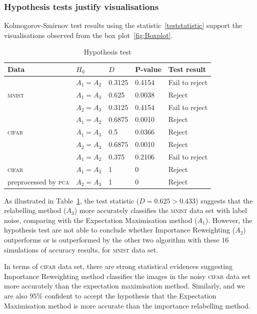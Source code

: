 \documentclass[12pt]{article} %
\begin{document}
\subsubsection{Hypothesis tests justify visualisations}
Kolmogorov-Smirnov test results using the statistic~\eqref{teststatistic} support the visualisations observed from the box plot~\ref{fig:Boxplot}.
\begin{table}%
\centering
 	\caption{Hypothesis test}
	\begin{tabular}{lllll}
\toprule
Data & $H_0$ & $D$ & P-value & Test result\\
\midrule
 & $A_1= A_2$  &0.3125 & 0.4154 & Fail to reject\\

 \textsc{mnist} & $A_1= A_3$ & 0.625 & 0.0038 & Reject\\

  & $A_2= A_3$ & 0.3125 & 0.4154 & Fail to reject\\
\midrule
   & $A_1= A_2$ & 0.6875 & 0.0010 & Reject\\

 \textsc{cifar}  & $A_1= A_3$ & 0.5 & 0.0366 & Reject\\

  &  $A_2=A_3$  & 0.6875 & 0.0010 & Reject\\
 \midrule
   & $A_1= A_2$ & 0.375 & 0.2106 & Fail to reject\\

 \textsc{cifar}  & $A_1= A_3$ & 1 & 0 & Reject\\

 preprocessed by \textsc{pca} &  $A_2=A_3$  & 1 & 0 & Reject\\
\bottomrule
\end{tabular}

	\label{tab:HypothesisTest}
\end{table}
As illustrated in  Table~\ref{tab:HypothesisTest}, the test statistic ($D=0.625>0.433$) suggests that the relabelling method ($A_3$) more accurately classifies the \textsc{mnist} data set with label noise, comparing with the Expectation Maximisation method ($A_1$).
However, the hypothesis test are not able to conclude whether Importance Reweighting ($A_2$) outperforms or is outperformed by the other two algorithm with these $16$ simulations of accuracy results, for \textsc{mnist} data set.

In terms of \textsc{cifar} data set, there are strong statistical evidences suggesting Importance Reweighting method classifies the images in the noisy \textsc{cifar} data set more accurately than the expectation maximisation method. Similarly, and we are also $95\%$ confident to accept the hypothesis that the Expectation Maximisation method is more accurate than the importance relabelling method.
\end{document}
